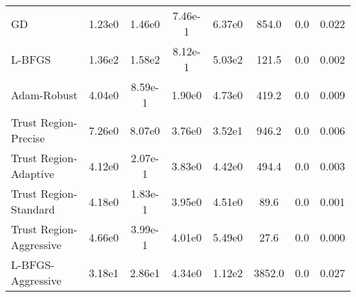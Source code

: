 \documentclass{article}
\begin{document}
\begin{table}[htbp]
{\begin{tabular}{p{2.5cm}*{7}{c}}
GD & 1.23e0 & 1.46e0 & 7.46e-1 & 6.37e0 & 854.0 & 0.0 & 0.022 \\
L-BFGS & 1.36e2 & 1.58e2 & 8.12e-1 & 5.03e2 & 121.5 & 0.0 & 0.002 \\
Adam-Robust & 4.04e0 & 8.59e-1 & 1.90e0 & 4.73e0 & 419.2 & 0.0 & 0.009 \\
Trust Region-Precise & 7.26e0 & 8.07e0 & 3.76e0 & 3.52e1 & 946.2 & 0.0 & 0.006 \\
Trust Region-Adaptive & 4.12e0 & 2.07e-1 & 3.83e0 & 4.42e0 & 494.4 & 0.0 & 0.003 \\
Trust Region-Standard & 4.18e0 & 1.83e-1 & 3.95e0 & 4.51e0 & 89.6 & 0.0 & 0.001 \\
Trust Region-Aggressive & 4.66e0 & 3.99e-1 & 4.01e0 & 5.49e0 & 27.6 & 0.0 & 0.000 \\
L-BFGS-Aggressive & 3.18e1 & 2.86e1 & 4.34e0 & 1.12e2 & 3852.0 & 0.0 & 0.027 \\
\bottomrule
\end{tabular}
}
\end{table}
\end{document}
